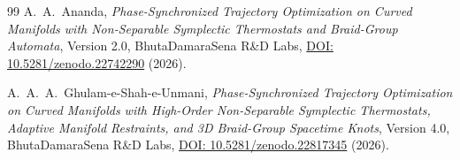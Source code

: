 \documentclass[11pt,a4paper,reqno]{article}
\theoremstyle{plain}
\theoremstyle{definition}
\theoremstyle{remark}
\numberwithin{equation}{section}
\begin{document}
\begin{thebibliography}{99}
A.~A.~Ananda, \textit{Phase-Synchronized Trajectory Optimization on Curved Manifolds with Non-Separable Symplectic Thermostats and Braid-Group Automata}, Version 2.0, BhutaDamaraSena R\&D Labs, \href{https://doi.org/10.5281/zenodo.22742290}{DOI: 10.5281/zenodo.22742290} (2026).

A.~A.~A.~Ghulam-e-Shah-e-Unmani, \textit{Phase-Synchronized Trajectory Optimization on Curved Manifolds with High-Order Non-Separable Symplectic Thermostats, Adaptive Manifold Restraints, and 3D Braid-Group Spacetime Knots}, Version 4.0, BhutaDamaraSena R\&D Labs, \href{https://doi.org/10.5281/zenodo.22817345}{DOI: 10.5281/zenodo.22817345} (2026).

\end{thebibliography}
\end{document}
